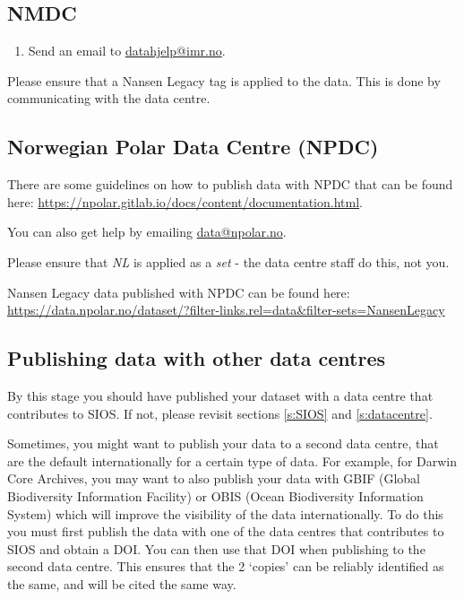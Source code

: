 \documentclass[a4paper,english, 11pt]{article}
\begin{document}
\subsection{NMDC}
\label{ss:NMDC}

\begin{enumerate}
\item Send an email to \href{mailto:datahjelp@imr.no}{datahjelp@imr.no}.
\end{enumerate}

Please ensure that a Nansen Legacy tag is applied to the data. This is done by communicating with the data centre.

\subsection{Norwegian Polar Data Centre (NPDC)}
\label{ss:NPI}

There are some guidelines on how to publish data with NPDC that can be found here: \url{https://npolar.gitlab.io/docs/content/documentation.html}.

You can also get help by emailing \href{mailto:data@npolar.no}{data@npolar.no}.

Please ensure that \textit{NL} is applied as a \textit{set} - the data centre staff do this, not you. 

Nansen Legacy data published with NPDC can be found here:
\url{https://data.npolar.no/dataset/?filter-links.rel=data&filter-sets=NansenLegacy}

\subsection{Publishing data with other data centres}
\label{ss:publishingGBIF}

By this stage you should have published your dataset with a data centre that contributes to SIOS. If not, please revisit sections \ref{s:SIOS} and \ref{s:datacentre}.

Sometimes, you might want to publish your data to a second data centre, that are the default internationally for a certain type of data. For example, for Darwin Core Archives, you may want to also publish your data with GBIF (Global Biodiversity Information Facility) or OBIS (Ocean Biodiversity Information System) which will improve the visibility of the data internationally. To do this you must first publish the data with one of the data centres that contributes to SIOS and obtain a DOI. You can then use that DOI when publishing to the second data centre. This ensures that the 2 `copies' can be reliably identified as the same, and will be cited the same way.
\end{document}
